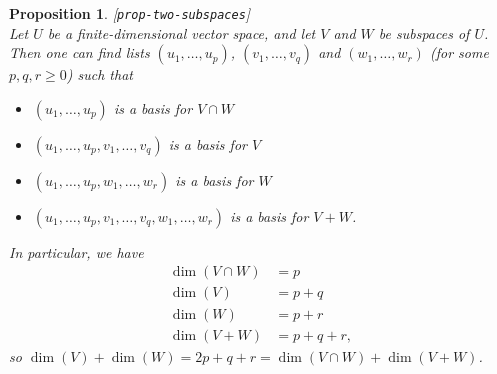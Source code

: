 \documentclass{amsart}
\newcommand{\lbl}[1]{\label{#1}\textup{[\texttt{#1}]}\ \\}
\newcommand{\lbl}{\label}
\renewcommand{\:}       {\colon}
\newtheorem{proposition}[theorem]{Proposition}
\theoremstyle{definition}
\begin{document}
\begin{proposition}\lbl{prop-two-subspaces}
 Let $U$ be a finite-dimensional vector space, and let $V$
 and $W$ be subspaces of $U$.  Then one can find lists
 $(u_1,\dotsc,u_p)$, $(v_1,\dotsc,v_q)$ and
 $(w_1,\dotsc,w_r)$ (for some $p,q,r\geq 0$) such that 
 \begin{itemize}
  \item $(u_1,\dotsc,u_p)$ is a basis for $V\cap W$
  \item $(u_1,\dotsc,u_p,v_1,\dotsc,v_q)$ is a basis for $V$
  \item $(u_1,\dotsc,u_p,w_1,\dotsc,w_r)$ is a basis for $W$
  \item $(u_1,\dotsc,u_p,v_1,\dotsc,v_q,w_1,\dotsc,w_r)$ is
   a basis for $V+W$.  
 \end{itemize}
 In particular, we have 
 \begin{align*}
  \dim(V\cap W) &= p \\
  \dim(V) &= p+q \\
  \dim(W) &= p+r \\
  \dim(V+W) &= p+q+r,
 \end{align*}
 so $\dim(V)+\dim(W)=2p+q+r=\dim(V\cap W)+\dim(V+W)$.
\end{proposition}
\end{document}
